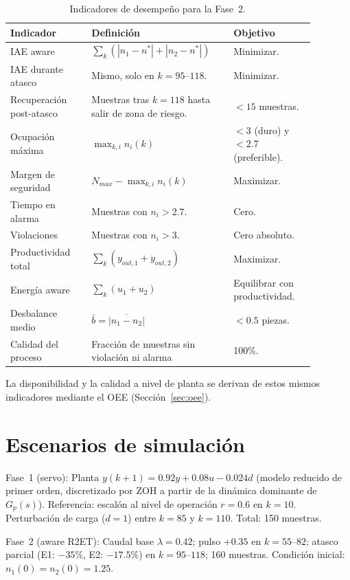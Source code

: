 \begin{table}[H]
\centering
\caption{Indicadores de desempeño para la Fase~2.}
\label{tab:indicadores_aware}
\begin{tabular}{@{}P{0.24\linewidth}P{0.40\linewidth}P{0.24\linewidth}@{}}
\toprule
Indicador & Definición & Objetivo \\ \midrule
IAE aware & $\sum_{k}(|n_1-n^*|+|n_2-n^*|)$ & Minimizar.\\
IAE durante atasco & Mismo, solo en $k=95$--$118$. & Minimizar.\\
Recuperación post-atasco & Muestras tras $k=118$ hasta salir de zona de riesgo. & $<15$ muestras.\\
Ocupación máxima & $\max_{k,i}n_i(k)$ & $< 3$ (duro) y $< 2.7$ (preferible).\\
Margen de seguridad & $N_{max} - \max_{k,i}n_i(k)$ & Maximizar.\\
Tiempo en alarma & Muestras con $n_i > 2.7$. & Cero.\\
Violaciones & Muestras con $n_i > 3$. & Cero absoluto.\\
Productividad total & $\sum_{k}(y_{out,1}+y_{out,2})$ & Maximizar.\\
Energía aware & $\sum_{k}(u_1+u_2)$ & Equilibrar con productividad.\\
Desbalance medio & $\bar{b} = \overline{|n_1-n_2|}$ & $< 0.5$ piezas.\\
Calidad del proceso & Fracción de muestras sin violación ni alarma & 100\%.\\
\bottomrule
\end{tabular}
\end{table}

La disponibilidad y la calidad a nivel de planta se derivan de estos mismos indicadores mediante el OEE (Sección~\ref{sec:oee}).

\section{Escenarios de simulación}

Fase~1 (servo): Planta $y(k+1)=0.92y+0.08u-0.024d$ (modelo reducido de primer orden, discretizado por ZOH a partir de la dinámica dominante de $G_p(s)$). Referencia: escalón al nivel de operación $r=0.6$ en $k=10$. Perturbación de carga ($d=1$) entre $k=85$ y $k=110$. Total: 150 muestras.

Fase~2 (aware R2ET): Caudal base $\lambda=0.42$; pulso $+0.35$ en $k=55$--$82$; atasco parcial (E1: $-35\%$, E2: $-17.5\%$) en $k=95$--$118$; 160 muestras. Condición inicial: $n_1(0)=n_2(0)=1.25$.

